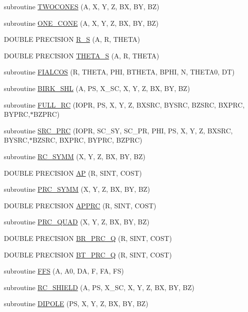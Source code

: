 \begin{CompactItemize}
\item 
subroutine \hyperlink{_tsyg2004_8f_da6b1a3dc7523ce7bc09c55324951441}{TWOCONES} (A, X, Y, Z, BX, BY, BZ)
\item 
subroutine \hyperlink{_tsyg2004_8f_ab281013369e2f232027ff169264fd07}{ONE\_\-CONE} (A, X, Y, Z, BX, BY, BZ)
\item 
DOUBLE PRECISION \hyperlink{_tsyg2004_8f_a821422093810532210ff6f1aec0920d}{R\_\-S} (A, R, THETA)
\item 
DOUBLE PRECISION \hyperlink{_tsyg2004_8f_a12656461ac8bbe57d950d6788f8a70a}{THETA\_\-S} (A, R, THETA)
\item 
subroutine \hyperlink{_tsyg2004_8f_a235fc0d312a21adba2d5810919adca8}{FIALCOS} (R, THETA, PHI, BTHETA, BPHI, N, THETA0, DT)
\item 
subroutine \hyperlink{_tsyg2004_8f_a921f6b182c2c1697df43273aa36f99e}{BIRK\_\-SHL} (A, PS, X\_\-SC, X, Y, Z, BX, BY, BZ)
\item 
subroutine \hyperlink{_tsyg2004_8f_0d4d2f068a308fa1c6c4bb86fac16f9b}{FULL\_\-RC} (IOPR, PS, X, Y, Z, BXSRC, BYSRC, BZSRC, BXPRC, BYPRC,$\ast$BZPRC)
\item 
subroutine \hyperlink{_tsyg2004_8f_948852414e8750ea8068ebe4f3d03e96}{SRC\_\-PRC} (IOPR, SC\_\-SY, SC\_\-PR, PHI, PS, X, Y, Z, BXSRC, BYSRC,$\ast$BZSRC, BXPRC, BYPRC, BZPRC)
\item 
subroutine \hyperlink{_tsyg2004_8f_53c65a56be777ddfe059d5623b3ee80e}{RC\_\-SYMM} (X, Y, Z, BX, BY, BZ)
\item 
DOUBLE PRECISION \hyperlink{_tsyg2004_8f_6241cc7194479481c6845fe9216f73f9}{AP} (R, SINT, COST)
\item 
subroutine \hyperlink{_tsyg2004_8f_e5d2a482ea368498294fcc6bedc734ad}{PRC\_\-SYMM} (X, Y, Z, BX, BY, BZ)
\item 
DOUBLE PRECISION \hyperlink{_tsyg2004_8f_d97fe9780c85165cf3d5efc106ad9f0e}{APPRC} (R, SINT, COST)
\item 
subroutine \hyperlink{_tsyg2004_8f_00310f7aecb95af18d5be726d529f907}{PRC\_\-QUAD} (X, Y, Z, BX, BY, BZ)
\item 
DOUBLE PRECISION \hyperlink{_tsyg2004_8f_d87c020522fe895268a9166c3f8292f6}{BR\_\-PRC\_\-Q} (R, SINT, COST)
\item 
DOUBLE PRECISION \hyperlink{_tsyg2004_8f_dbd25510c3ba667598e7c14abcc5b786}{BT\_\-PRC\_\-Q} (R, SINT, COST)
\item 
subroutine \hyperlink{_tsyg2004_8f_8d9b5c31c4fb074683c40c0fa923c3a2}{FFS} (A, A0, DA, F, FA, FS)
\item 
subroutine \hyperlink{_tsyg2004_8f_f5b31c6f54b60f926656e483aa50ebac}{RC\_\-SHIELD} (A, PS, X\_\-SC, X, Y, Z, BX, BY, BZ)
\item 
subroutine \hyperlink{_tsyg2004_8f_b2b4bf9a582d902f19522d4db9af8f34}{DIPOLE} (PS, X, Y, Z, BX, BY, BZ)
\end{CompactItemize}


